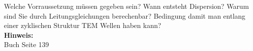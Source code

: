 \begin{question}[section=5,subsection=52,name={TEM-Wellen},difficulty=6,type=mdl,tags={}]
	Welche Vorraussetzung müssen gegeben sein? Wann entsteht Dispersion? 
	Warum sind Sie durch Leitungsgleichungen berechenbar?
	Bedingung damit man entlang einer zyklischen Struktur TEM Wellen haben kann?
	\\ \textbf{Hinweis:}\\
	Buch Seite 139
\end{question}
\begin{solution}
	
\end{solution}